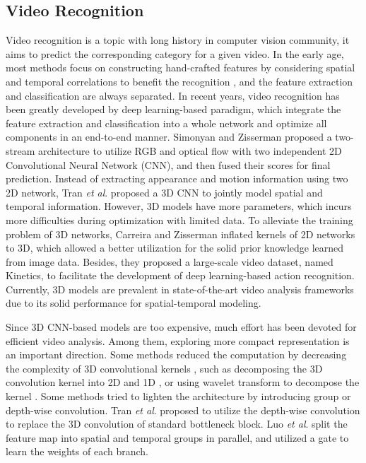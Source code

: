 \documentclass[journal]{IEEEtran}
\newcommand{\etal}{\textit{et al}. }
\begin{document}
\subsection{Video Recognition}
Video recognition is a topic with long history in computer vision community, it aims to predict the corresponding category for a given video.
In the early age, most methods focus on constructing hand-crafted features by considering spatial and temporal correlations to benefit the recognition \cite{wang2013action, bregonzio2009recognising}, and the feature extraction and classification are always separated.
In recent years, video recognition has been greatly developed by deep learning-based paradigm, which integrate the feature extraction and classification into a whole network and optimize all components in an end-to-end manner.
Simonyan and Zisserman \cite{simonyan2014two} proposed a two-stream architecture to utilize RGB and optical flow with two independent 2D Convolutional Neural Network (CNN), and then fused their scores for final prediction.
Instead of extracting appearance and motion information using two 2D network, Tran \etal \cite{tran2015learning} proposed a 3D CNN to jointly model spatial and temporal information.
However, 3D models have more parameters, which incurs more difficulties during optimization with limited data.
To alleviate the training problem of 3D networks, Carreira and Zisserman \cite{carreira2017quo} inflated kernels of 2D networks to 3D, which allowed a better utilization for the solid prior knowledge learned from image data.
Besides, they proposed a large-scale video dataset, named Kinetics, to facilitate the development of deep learning-based action recognition.
Currently, 3D models are prevalent in state-of-the-art video analysis frameworks \cite{ji2019context, wang2021interactive, wang2020symbiotic, chen2021infrared, xu2018sequential, wang2021t2vlad, wu2020learning} due to its solid performance for spatial-temporal modeling.

Since 3D CNN-based models are too expensive, much effort has been devoted for efficient video analysis.
Among them, exploring more compact representation is an important direction.
Some methods reduced the computation by decreasing the complexity of 3D convolutional kernels \cite{carreira2017quo, hara2018can}, such as decomposing the 3D convolution kernel into 2D and 1D \cite{xie2018rethinking, qiu2017learning}, or using wavelet transform to decompose the kernel \cite{chen2020frequency}.
Some methods \cite{tran2019video, luo2019grouped, kumawat2021depthwise} tried to lighten the architecture by introducing group or depth-wise convolution.
Tran \etal \cite{tran2019video} proposed to utilize the depth-wise convolution to replace the 3D convolution of standard bottleneck block.
Luo \etal \cite{luo2019grouped} split the feature map into spatial and temporal groups in parallel, and utilized a gate to learn the weights of each branch.
\end{document}
